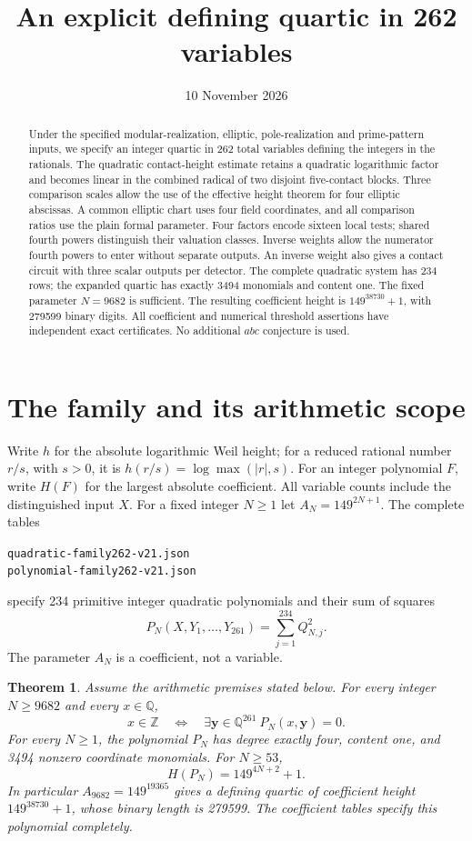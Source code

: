 \documentclass[11pt,a4paper]{article}
\title{An explicit defining quartic in 262 variables}
\author{}\date{10 November 2026}
\newtheorem{theorem}{Theorem}[section]\newtheorem{lemma}[theorem]{Lemma}
\newcommand{\Q}{\mathbb Q}\newcommand{\Z}{\mathbb Z}\newcommand{\HH}{\mathcal H}
\begin{document}
\maketitle
\begin{abstract}
Under the specified modular-realization, elliptic, pole-realization and
prime-pattern inputs, we specify an integer quartic in 262 total
variables defining the integers in the rationals. The quadratic
contact-height estimate retains a quadratic logarithmic factor and
becomes linear in the combined radical of two disjoint five-contact
blocks. Three comparison scales allow the use
of the effective height theorem for four elliptic abscissas. A common
elliptic chart uses four field coordinates, and all comparison ratios
use the plain formal parameter. Four factors encode sixteen local tests;
shared fourth powers distinguish their valuation classes. Inverse weights
allow the numerator fourth powers to enter without separate outputs.
An inverse weight also gives a contact circuit with three scalar
outputs per detector. The complete quadratic system has 234 rows;
the expanded quartic has exactly 3494 monomials and content one.
The fixed parameter $N=9682$ is sufficient. The resulting coefficient
height is $149^{38730}+1$, with 279599 binary digits. All coefficient
and numerical threshold assertions have independent exact
certificates. No additional $abc$ conjecture is used.
\end{abstract}

\section{The family and its arithmetic scope}
Write $h$ for the absolute logarithmic Weil height; for a reduced
rational number $r/s$, with $s>0$, it is
$h(r/s)=\log\max(|r|,s)$. For an integer polynomial $F$, write
$H(F)$ for the largest absolute coefficient. All variable counts
include the distinguished input $X$. For a fixed
integer $N\ge1$ let $A_N=149^{2N+1}$. The complete tables
\begin{center}\small
\nolinkurl{quadratic-family262-v21.json}\\
\nolinkurl{polynomial-family262-v21.json}
\end{center}
specify 234 primitive integer
quadratic polynomials and their sum of squares
\[
 P_N(X,Y_1,\ldots,Y_{261})=\sum_{j=1}^{234}Q_{N,j}^2.
\]
The parameter $A_N$ is a coefficient, not a variable.

\begin{theorem}\label{thm:main}
Assume the arithmetic premises stated below. For every integer
$N\ge9682$ and every $x\in\Q$,
\[
 x\in\Z\quad\Longleftrightarrow\quad
 \exists\mathbf y\in\Q^{261}\ P_N(x,\mathbf y)=0.
\]
For every $N\ge1$, the polynomial $P_N$ has degree exactly four,
content one, and 3494 nonzero coordinate monomials. For $N\ge53$,
\[
                       H(P_N)=149^{4N+2}+1.
\]
In particular $A_{9682}=149^{19365}$ gives a defining quartic of
coefficient height $149^{38730}+1$, whose binary length is 279599.
The coefficient tables specify this polynomial completely.
\end{theorem}
\end{document}

